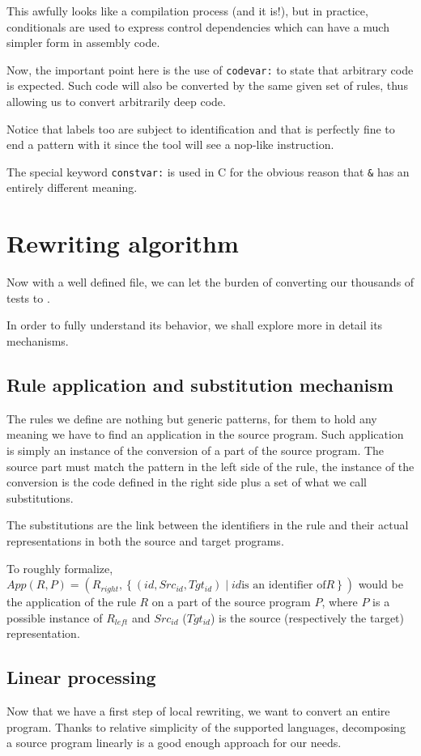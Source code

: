 This awfully looks like a compilation process (and it is!), but in practice,
conditionals are used to express control dependencies which can have a much
simpler form in assembly code.

Now, the important point here is the use of \verb+codevar:+ to state that
arbitrary code is expected. Such code will also be converted by the same
given set of rules, thus allowing us to convert arbitrarily deep code.

Notice that labels too are subject to identification and that is
perfectly fine to end a pattern with it since the tool will see
a nop-like instruction.

The special keyword \verb+constvar:+ is used in C for the obvious reason
that \verb+&+ has an entirely different meaning.

\section{Rewriting algorithm}
Now with a well defined file, we can let the burden of converting our
thousands of tests to \jingle{}.

In order to fully understand its behavior, we shall explore
more in detail its mechanisms.

\subsection{Rule application and substitution mechanism}
The rules we define are nothing but generic patterns, for them
to hold any meaning we have to find an application in the source program.
Such application is simply an instance of the conversion of a part
of the source program. The source part must match the pattern in the
left side of the rule, the instance of the conversion is the code
defined in the right side plus a set of what we call substitutions.

The substitutions are the link between the identifiers in the rule
and their actual representations in both the source and target programs.

To roughly formalize,
$App(R, P) = \left(R_{right}, \left\{\left(id,Src_{id},Tgt_{id}\right) \mid id \text{is an identifier of} R\right\}\right)$
would be the application of the rule $R$ on a part of the source program $P$,
where $P$ is a possible instance of $R_{left}$ and $Src_{id}$ ($Tgt_{id}$) is the source
(respectively the target) representation.

\subsection{Linear processing}
Now that we have a first step of local rewriting, we want to convert an entire
program. Thanks to relative simplicity of the supported languages, decomposing
a source program linearly is a good enough approach for our needs.

